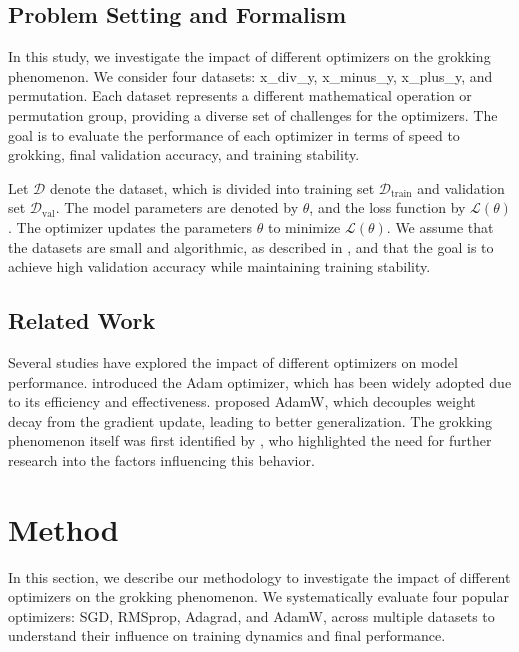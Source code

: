 \documentclass{article} %
\begin{document}
\subsection{Problem Setting and Formalism}
In this study, we investigate the impact of different optimizers on the grokking phenomenon. We consider four datasets: x\_div\_y, x\_minus\_y, x\_plus\_y, and permutation. Each dataset represents a different mathematical operation or permutation group, providing a diverse set of challenges for the optimizers. The goal is to evaluate the performance of each optimizer in terms of speed to grokking, final validation accuracy, and training stability.

Let \( \mathcal{D} \) denote the dataset, which is divided into training set \( \mathcal{D}_{\text{train}} \) and validation set \( \mathcal{D}_{\text{val}} \). The model parameters are denoted by \( \theta \), and the loss function by \( \mathcal{L}(\theta) \). The optimizer updates the parameters \( \theta \) to minimize \( \mathcal{L}(\theta) \). We assume that the datasets are small and algorithmic, as described in \citet{power2022grokking}, and that the goal is to achieve high validation accuracy while maintaining training stability.

\subsection{Related Work}
Several studies have explored the impact of different optimizers on model performance. \citet{kingma2014adam} introduced the Adam optimizer, which has been widely adopted due to its efficiency and effectiveness. \citet{loshchilov2017adamw} proposed AdamW, which decouples weight decay from the gradient update, leading to better generalization. The grokking phenomenon itself was first identified by \citet{power2022grokking}, who highlighted the need for further research into the factors influencing this behavior.

\section{Method}
\label{sec:method}

In this section, we describe our methodology to investigate the impact of different optimizers on the grokking phenomenon. We systematically evaluate four popular optimizers: SGD, RMSprop, Adagrad, and AdamW, across multiple datasets to understand their influence on training dynamics and final performance.
\end{document}
